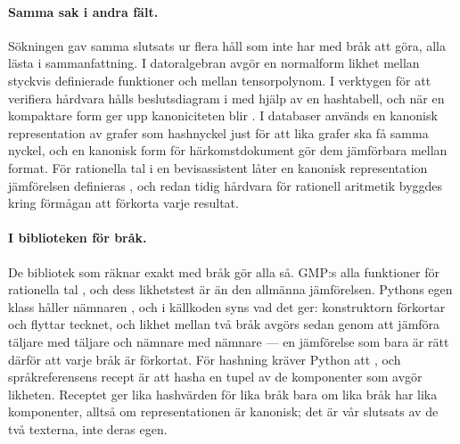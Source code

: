 \paragraph{Samma sak i andra fält.}  Sökningen gav samma slutsats ur
flera håll som inte har med bråk att göra, alla lästa i sammanfattning.
I datoralgebran avgör en normalform likhet mellan styckvis definierade
funktioner\autocite{vonMohrenschildt1998} och mellan
tensorpolynom\autocite{Liu2017Riemann}.  I verktygen för att verifiera
hårdvara hålls beslutsdiagram i  med hjälp av en hashtabell, och när en
kompaktare form ger upp kanoniciteten blir .  I databaser används en
kanonisk representation av grafer som hashnyckel just för att lika
grafer ska få samma nyckel\autocite{Williams2007Graph}, och en kanonisk
form för härkomstdokument gör dem jämförbara mellan
format\autocite{Moreau2017PROV}.  För rationella tal i en bevisassistent
låter en kanonisk representation jämförelsen definieras
, och redan tidig
hårdvara för rationell aritmetik byggdes kring förmågan att förkorta
varje resultat\autocite{IrwinSmith1981}.

\paragraph{I biblioteken för bråk.}  De bibliotek som räknar exakt med
bråk gör alla så.  GMP:s alla funktioner för rationella tal
, och dess likhetstest är
 än den allmänna jämförelsen.
Pythons egen klass håller nämnaren , och i källkoden syns vad det
ger: konstruktorn förkortar och flyttar tecknet, och likhet mellan två
bråk avgörs sedan genom att jämföra täljare med täljare och nämnare med
nämnare\autocite{CPythonFractionsSource} --- en jämförelse som bara är
rätt därför att varje bråk är förkortat.  För hashning kräver Python att
, och
språkreferensens recept är att hasha en tupel av de komponenter som
avgör likheten\autocite{PythonDataModel}.  Receptet ger lika hashvärden
för lika bråk bara om lika bråk har lika komponenter, alltså om
representationen är kanonisk; det är vår slutsats av de två texterna,
inte deras egen.

